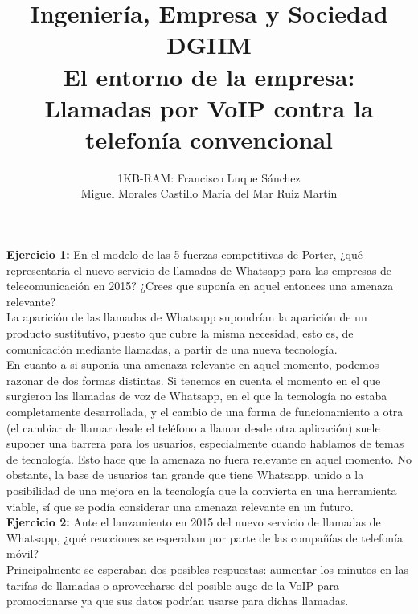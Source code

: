 \documentclass[11pt]{article}
\theoremstyle{plain}
\theoremstyle{definition}
\begin{document}
\title{Ingeniería, Empresa y Sociedad \\
  DGIIM \\
  \large El entorno de la empresa: Llamadas por VoIP contra la
  telefonía convencional }
\author{1KB-RAM:  Francisco Luque Sánchez\\
  Miguel Morales Castillo María del Mar Ruiz Martín}

\maketitle

\textbf{Ejercicio 1:} En el modelo de las 5 fuerzas competitivas de
Porter, ¿qué representaría el nuevo servicio de llamadas de Whatsapp
para las empresas de telecomunicación en 2015? ¿Crees que suponía en
aquel entonces una amenaza relevante?\\

La aparición de las llamadas de Whatsapp supondrían la aparición de un
producto sustitutivo, puesto que cubre la misma necesidad, esto es,
de comunicación mediante llamadas, a partir de una nueva tecnología.\\

En cuanto a si suponía una amenaza relevante en aquel momento, podemos
razonar de dos formas distintas. Si tenemos en cuenta el momento en el
que surgieron las llamadas de voz de Whatsapp, en el que la tecnología
no estaba completamente desarrollada, y el cambio de una forma de
funcionamiento a otra (el cambiar de llamar desde el teléfono a llamar
desde otra aplicación) suele suponer una barrera para los usuarios,
especialmente cuando hablamos de temas de tecnología. Esto hace que la
amenaza no fuera relevante en aquel momento. No obstante, la base de
usuarios tan grande que tiene Whatsapp, unido a la posibilidad de una
mejora en la tecnología que la convierta en una herramienta viable, sí
que se podía considerar una amenaza relevante en un futuro.\\

\textbf{Ejercicio 2:} Ante el lanzamiento en 2015 del nuevo servicio
de llamadas de Whatsapp, ¿qué reacciones se esperaban por parte de las
compañías de telefonía móvil?\\

Principalmente se esperaban dos posibles respuestas: aumentar los
minutos en las tarifas de llamadas o aprovecharse del posible auge de
la VoIP para promocionarse ya que sus datos podrían usarse para
dichas llamadas.\\
\end{document}
